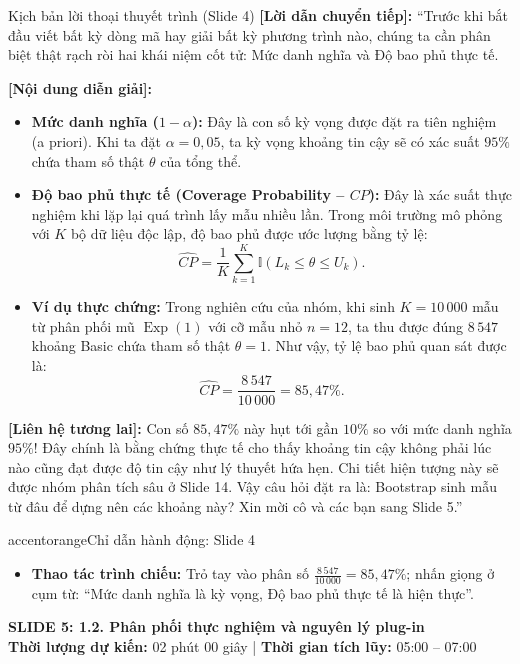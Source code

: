 \documentclass[10pt,a4paper]{article}
\newcommand{\slideheader}[4]{
    \vspace{0.4cm}
    \begin{tcolorbox}[colback=primary!7!white, colframe=primary, arc=2mm, boxrule=1pt, left=4mm, right=4mm, top=2.5mm, bottom=2.5mm]
        {\Large\bfseries\color{primary} SLIDE #1: #2}\\[0.1cm]
        {\small\textbf{Thời lượng dự kiến:} #3 \quad | \quad \textbf{Thời gian tích lũy:} #4}
    \end{tcolorbox}
    \vspace{0.15cm}
}
\begin{document}
\begin{scriptbox}{Kịch bản lời thoại thuyết trình (Slide 4)}
    \textbf{[Lời dẫn chuyển tiếp]:} ``Trước khi bắt đầu viết bất kỳ dòng mã hay giải bất kỳ phương trình nào, chúng ta cần phân biệt thật rạch ròi hai khái niệm cốt tử: Mức danh nghĩa và Độ bao phủ thực tế.
    
    \textbf{[Nội dung diễn giải]:} 
    \begin{itemize}
        \item \textbf{Mức danh nghĩa ($1-\alpha$):} Đây là con số kỳ vọng được đặt ra tiên nghiệm (a priori). Khi ta đặt $\alpha = 0{,}05$, ta kỳ vọng khoảng tin cậy sẽ có xác suất $95\%$ chứa tham số thật $\theta$ của tổng thể.
        \item \textbf{Độ bao phủ thực tế (Coverage Probability -- $CP$):} Đây là xác suất thực nghiệm khi lặp lại quá trình lấy mẫu nhiều lần. Trong môi trường mô phỏng với $K$ bộ dữ liệu độc lập, độ bao phủ được ước lượng bằng tỷ lệ:
        \[
        \widehat{CP} = \frac{1}{K}\sum_{k=1}^K \mathbb{I}(L_k \le \theta \le U_k).
        \]
        \item \textbf{Ví dụ thực chứng:} Trong nghiên cứu của nhóm, khi sinh $K=10\,000$ mẫu từ phân phối mũ $\operatorname{Exp}(1)$ với cỡ mẫu nhỏ $n=12$, ta thu được đúng $8\,547$ khoảng Basic chứa tham số thật $\theta=1$. Như vậy, tỷ lệ bao phủ quan sát được là:
        \[
        \widehat{CP} = \frac{8\,547}{10\,000} = 85{,}47\%.
        \]
    \end{itemize}
    \textbf{[Liên hệ tương lai]:} Con số $85{,}47\%$ này hụt tới gần $10\%$ so với mức danh nghĩa $95\%$! Đây chính là bằng chứng thực tế cho thấy khoảng tin cậy không phải lúc nào cũng đạt được độ tin cậy như lý thuyết hứa hẹn. Chi tiết hiện tượng này sẽ được nhóm phân tích sâu ở Slide 14. Vậy câu hỏi đặt ra là: Bootstrap sinh mẫu từ đâu để dựng nên các khoảng này? Xin mời cô và các bạn sang Slide 5.''
\end{scriptbox}

\begin{actionbox}{accentorange}{Chỉ dẫn hành động: Slide 4}
    \begin{itemize}
        \item \textbf{Thao tác trình chiếu:} Trỏ tay vào phân số $\frac{8\,547}{10\,000} = 85{,}47\%$; nhấn giọng ở cụm từ: ``Mức danh nghĩa là kỳ vọng, Độ bao phủ thực tế là hiện thực''.
    \end{itemize}
\end{actionbox}

\slideheader{5}{1.2. Phân phối thực nghiệm và nguyên lý plug-in}{02 phút 00 giây}{05:00 -- 07:00}
\end{document}
